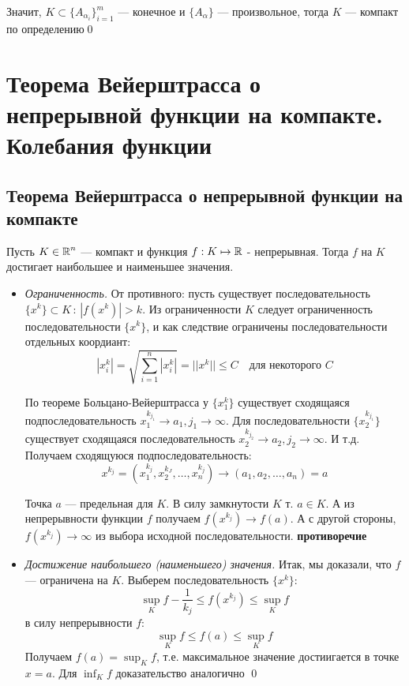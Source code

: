 \documentclass[a4paper, 10pt]{article}
\begin{document}
Значит, $K\subset\{A_{\alpha_i}\}_{i=1}^{m}$ — конечное и $\{A_{\alpha}\}$ — произвольное, тогда $K$ — компакт по определению\qed

\newpage
\section{Теорема Вейерштрасса о непрерывной функции на компакте. Колебания функции}

\subsection{Теорема Вейерштрасса о непрерывной функции на компакте}
\theorem Пусть $K\in \operatorname{\mathbb{R}}^n$ — компакт и функция $f: K\mapsto \operatorname{\mathbb{R}}$ - непрерывная. Тогда $f$ на $K$ достигает наибольшее и наименьшее значения.

\proof 
\begin{itemize}
    \item \textit{Ограниченность.} От противного: пусть существует последовательность $\{x^k\} \subset K \,:\, |f(x^k)| > k$. Из ограниченности $K$ следует ограниченность последовательности $\{x^k\}$, и как следствие ограничены последовательности отдельных коордиант:
    \begin{equation*}
        |x_i^k| = \sqrt{\sum_{i=1}^n|x_i^k|} = ||x^k|| \le C \quad \text{для некоторого }C
    \end{equation*}

    По теореме Больцано-Вейерштрасса у $\{x_1^k\}$ существует сходящаяся подпоследовательность $x_1^{k_{j_1}} \to a_1, j_1 \to \infty$. Для последовательности $\{x_2^{k_{j_1}}\}$ существует сходящаяся последовательность $x_2^{k_{j_2}} \to a_2, j_2 \to \infty$. И т.д. Получаем сходящуюся подпоследовательность:
    \begin{equation*}
        x^{k_j} = (x_1^{k_j}, x_2^{k_J}, \ldots, x_n^{k_j})\to(a_1, a_2, \ldots, a_n) = a
    \end{equation*}

    Точка $a$ — предельная для $K$. В силу замкнутости $K$ т. $a\in K$. А из непрерывности функции $f$ получаем $f(x^{k_j}) \to f(a)$. А с другой стороны, $f(x^{k_j})\to\infty$ из выбора исходной последовательности. \textbf{противоречие}

    \item \textit{Достижение наибольшего (наименьшего) значения.} Итак, мы доказали, что $f$ — ограничена на $K$. Выберем последовательность $\{x^k\}$:
    \begin{equation*}
        \sup_K f - \frac{1}{k_j} \le f(x^{k_j}) \le \sup_K f
    \end{equation*}
    в силу непрерывности $f$:
    \begin{equation*}
        \sup_K f \le f(a) \le \sup_K f
    \end{equation*}
    Получаем $f(a) = \displaystyle\sup_K f$, т.е. максимальное значение достиигается в точке $x = a$. Для $\displaystyle\inf_K f$ доказательство аналогично
    \qed
\end{itemize}
\end{document}
